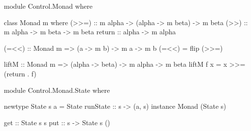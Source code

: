 \begin{code}
module Control.Monad where

class Monad m where
		(>>=) :: m alpha -> (alpha -> m beta) -> m beta
		(>>) :: m alpha -> m beta -> m beta
		return :: alpha -> m alpha

(=<<) :: Monad m => (a -> m b) -> m a -> m b
(=<<) = flip (>>=)

liftM :: Monad m => (alpha -> beta) -> m alpha -> m beta
liftM f x = x >>= (return . f)
\end{code}


\begin{code}
module Control.Monad.State where

newtype State s a = State	{runState :: s -> (a, s)}
instance Monad (State s)

get :: State s s
put :: s -> State s ()
\end{code}
